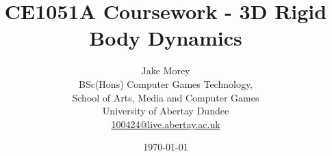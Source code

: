 \title{CE1051A Coursework - 3D Rigid Body Dynamics}
\author{Jake Morey \\BSc(Hons) Computer Games Technology, \\School of Arts, Media and Computer Games
 \\ University of Abertay Dundee \\ \href{mailto:100424@live.abertay.ac.uk}{100424@live.abertay.ac.uk}}
\date{\today}

\maketitle
\thispagestyle{empty}
\doublespacing
\clearpage

\setcounter{page}{2}
\pagestyle{plain}